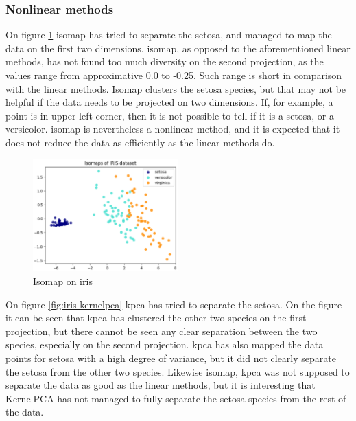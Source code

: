 \subsubsection{Nonlinear methods}\label{subsubsec:nonlinear-methods-on-iris}
On figure \ref{fig:iris-isomap} \gls{isomap} has tried to separate the setosa, and managed to map the data on the first two dimensions. \gls{isomap}, as opposed to the aforementioned linear methods, has not found too much diversity on the second projection, as the values range from approximative 0.0 to -0.25. Such range is short in comparison with the linear methods. Isomap clusters the setosa species, but that may not be helpful if the data needs to be projected on two dimensions. If, for example, a point is in upper left corner, then it is not possible to tell if it is a setosa, or a versicolor. \gls{isomap} is nevertheless a nonlinear method, and it is expected that it does not reduce the data as efficiently as the linear methods do.

\begin{figure}[htb!]
    \centering
    \includegraphics[width=0.5\textwidth]{figures/theory-example-figures/iris-isomap.png}
    \caption{Isomap on iris}
    \label{fig:iris-isomap}
    \end{figure}

On figure \ref{fig:iris-kernelpca} \gls{kpca} has tried to separate the setosa. On the figure it can be seen that \gls{kpca} has clustered the other two species on the first projection, but there cannot be seen any clear separation between the two species, especially on the second projection. \gls{kpca} has also mapped the data points for setosa with a high degree of variance, but it did not clearly separate the setosa from the other two species. Likewise \gls{isomap}, \gls{kpca} was not supposed to separate the data as good as the linear methods, but it is interesting that KernelPCA has not managed to fully separate the setosa species from the rest of the data.


